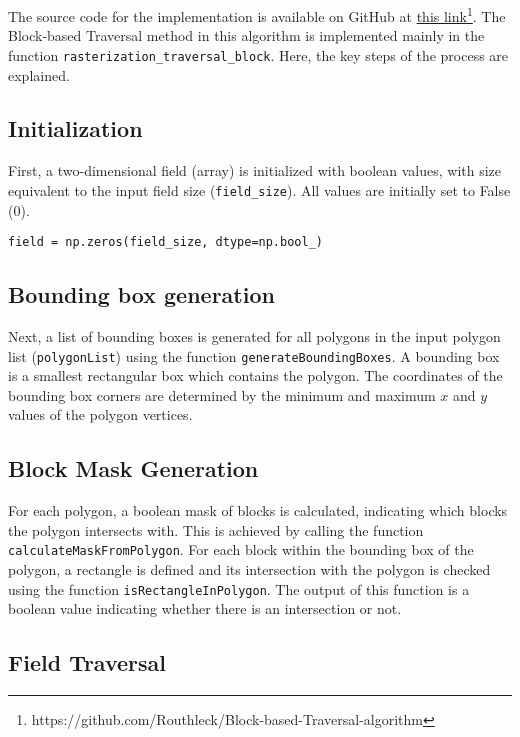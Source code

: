 \documentclass[
	a4paper, %
	10pt, %
	unnumberedsections, %
	twoside, %
]{LTJournalArticle}
\begin{document}
The source code for the implementation is available on GitHub at \href{https://github.com/Routhleck/Block-based-Traversal-algorithm}{this link}\footnote{https://github.com/Routhleck/Block-based-Traversal-algorithm}.
The Block-based Traversal method in this algorithm is implemented mainly in the function \texttt{rasterization\_traversal\_block}. Here, the key steps of the process are explained.

\subsection{Initialization}

First, a two-dimensional field (array) is initialized with boolean values, with size equivalent to the input field size (\texttt{field\_size}). All values are initially set to False (0).

\begin{verbatim}
field = np.zeros(field_size, dtype=np.bool_)
\end{verbatim}

\subsection{Bounding box generation}
Next, a list of bounding boxes is generated for all polygons in the input polygon list (\texttt{polygonList}) using the function \texttt{generateBoundingBoxes}. A bounding box is a smallest rectangular box which contains the polygon. The coordinates of the bounding box corners are determined by the minimum and maximum $x$ and $y$ values of the polygon vertices.

\subsection{Block Mask Generation}

For each polygon, a boolean mask of blocks is calculated, indicating which blocks the polygon intersects with. This is achieved by calling the function \texttt{calculateMaskFromPolygon}. For each block within the bounding box of the polygon, a rectangle is defined and its intersection with the polygon is checked using the function \texttt{isRectangleInPolygon}. The output of this function is a boolean value indicating whether there is an intersection or not.

\subsection{Field Traversal}
\end{document}
